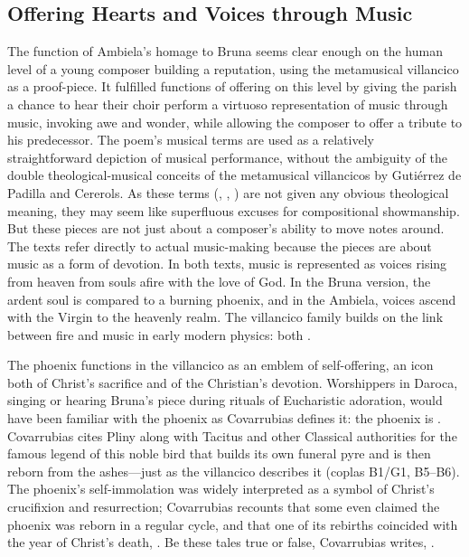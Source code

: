 \subsection{Offering Hearts and Voices through Music}

The function of Ambiela's homage to Bruna seems clear enough on the human level
of a young composer building a reputation, using the metamusical villancico as
a proof-piece.
It fulfilled functions of offering on this level by giving the parish a chance
to hear their choir perform a virtuoso representation of music through music,
invoking awe and wonder, while allowing the composer to offer a tribute to his
predecessor.
The poem's musical terms are used as a relatively straightforward depiction of
musical performance, without the ambiguity of the double theological-musical
conceits of the metamusical villancicos by Gutiérrez de Padilla and Cererols.
As these terms (, , ) are
not given any obvious theological meaning, they may seem like superfluous
excuses for compositional showmanship.
But these pieces are not just about a composer's ability to move notes around.
The texts refer directly to actual music-making because the pieces are about
music as a form of devotion.
In both texts, music is represented as voices rising from heaven from souls
afire with the love of God.
In the Bruna version, the ardent soul is compared to a burning phoenix, and in
the Ambiela, voices ascend with the Virgin to the heavenly realm.
The villancico family builds on the link between fire and music in early modern
physics: both .

The phoenix functions in the villancico as an emblem of self-offering, an icon
both of Christ's sacrifice and of the Christian's devotion.
Worshippers in Daroca, singing or hearing Bruna's piece during rituals of
Eucharistic adoration, would have been familiar with the phoenix as Covarrubias
defines it: the phoenix is .%
    \Autocite[400, ]{Covarrubias:Tesoro}
Covarrubias cites Pliny along with Tacitus and other Classical authorities for
the famous legend of this noble bird that builds its own funeral pyre and is
then reborn from the ashes---just as the villancico describes it (coplas B1/G1,
B5--B6).
The phoenix's self-immolation was widely interpreted as a symbol of Christ's
crucifixion and resurrection; Covarrubias recounts that some even claimed the
phoenix was reborn in a regular cycle, and that one of its rebirths coincided
with the year of Christ's death, .
Be these tales true or false, Covarrubias writes, .%
    \Autocite[400, ]{Covarrubias:Tesoro}

